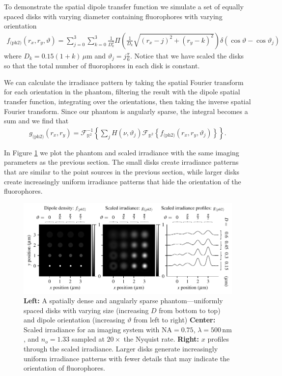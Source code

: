 \documentclass[]{osa-article}
\providecommand{\mc}[1]{\mathcal{#1}}
\providecommand{\mbb}[1]{\mathbb{#1}}
\begin{document}
 To demonstrate the spatial dipole transfer function we simulate a set of
 equally spaced disks with varying diameter containing fluorophores with varying
 orientation
 \begin{align}
   f_{\text{(ph2)}}(r_x, r_y, \vartheta) = \sum_{j=0}^3 \sum_{k=0}^3 \frac{1}{D_k^2}\Pi\left(\frac{1}{D_k}\sqrt{\left(r_x - j\right)^2 + \left(r_y - k\right)^2}\right) \delta\left(\cos\vartheta - \cos\vartheta_j\right)\,\label{eq:phantom2}
 \end{align}
 where $D_k = 0.15(1+k)\, \mu$m and $\vartheta_j = j\frac{\pi }{6}$. Notice that
 we have scaled the disks so that the total number of fluorophores in each disk
 is constant.

 We can calculate the irradiance pattern by taking the spatial Fourier transform
 for each orientation in the phantom, filtering the result with the dipole
 spatial transfer function, integrating over the orientations, then taking the
 inverse spatial Fourier transform. Since our phantom is angularly sparse, the
 integral becomes a sum and we find that
 \begin{align}
   g_{\text{(ph2)}}(r_x, r_y) = \mc{F}^{-1}_{\mbb{R}^2}\left\{\sum_{j}H(\nu, \vartheta_j)\mc{F}_{\mbb{R}^2}\left\{f_{\text{(ph2)}}(r_x, r_y, \vartheta_j)\right\}\right\}.
 \end{align}

 In Figure \ref{fig:ph2} we plot the phantom and scaled irradiance with the same
 imaging parameters as the previous section. The small disks create irradiance
 patterns that are similar to the point sources in the previous section, while
 larger disks create increasingly uniform irradiance patterns that hide the
 orientation of the fluorophores.
  
  \begin{figure}[h]
 \centering
   \centering
   \includegraphics[scale=0.8]{../figures/paratfs/ph2.pdf}
   \caption{\textbf{Left:} A spatially dense and angularly sparse
     phantom---uniformly spaced disks with varying size (increasing $D$ from
     bottom to top) and dipole orientation (increasing $\vartheta$ from left to
     right) \textbf{Center:} Scaled irradiance for an imaging system with
     $\text{NA} = 0.75$, $\lambda = 500\,\text{nm}$, and $n_o = 1.33$ sampled at
     $20\times$ the Nyquist rate. \textbf{Right:} $x$ profiles through the
     scaled irradiance. Larger disks generate increasingly uniform irradiance
     patterns with fewer details that may indicate the orientation of
     fluorophores.}
   \label{fig:ph2}
 \end{figure}
\end{document}
